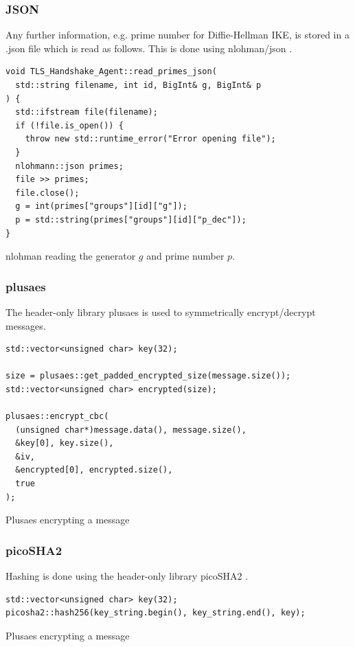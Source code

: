 \documentclass[12pt, letterpaper]{article}
\newenvironment{code}{\captionsetup{type=listing}}{}
\begin{document}
\subsubsection{JSON}
Any further information, e.g. prime number for Diffie-Hellman IKE, is stored in a .json file which is read as follows. This is done using nlohman/json \cite{json_ref}.

\begin{code}
	\begin{verbatim}
void TLS_Handshake_Agent::read_primes_json(
  std::string filename, int id, BigInt& g, BigInt& p
) {
  std::ifstream file(filename);
  if (!file.is_open()) {
    throw new std::runtime_error("Error opening file");
  }
  nlohmann::json primes;
  file >> primes;
  file.close();
  g = int(primes["groups"][id]["g"]); 
  p = std::string(primes["groups"][id]["p_dec"]);
}
	\end{verbatim}
	\caption{nlohman reading the generator $g$ and prime number $p$.}
	\label{json}
\end{code}


\subsubsection{plusaes}
The header-only library plusaes \cite{plusaes} is used to symmetrically encrypt/decrypt messages.

\begin{code}
	\begin{verbatim}
std::vector<unsigned char> key(32);
	
size = plusaes::get_padded_encrypted_size(message.size());
std::vector<unsigned char> encrypted(size);
	
plusaes::encrypt_cbc(
  (unsigned char*)message.data(), message.size(), 
  &key[0], key.size(), 
  &iv, 
  &encrypted[0], encrypted.size(), 
  true
);

	\end{verbatim}
	\caption{Plusaes encrypting a message}
	\label{plusaes}
\end{code}

\subsubsection{picoSHA2}
Hashing is done using the header-only library picoSHA2 \cite{picosha}.

\begin{code}
	\begin{verbatim}
std::vector<unsigned char> key(32);
picosha2::hash256(key_string.begin(), key_string.end(), key);
	\end{verbatim}
	\caption{Plusaes encrypting a message}
	\label{picosha2}
\end{code}
\end{document}
